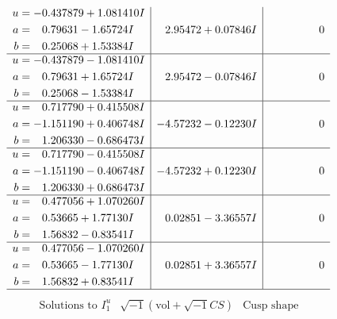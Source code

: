 \documentclass[1p]{elsarticle_modified}
\theoremstyle{definition}
\newcommand{\I}{\sqrt{-1}}
\begin{document}
$$\begin{array}{c|c|c}
\begin{aligned}
u &= -0.437879 + 1.081410 I \\
a &= \phantom{-}0.79631 - 1.65724 I \\
b &= \phantom{-}0.25068 + 1.53384 I\end{aligned}
 & \phantom{-}2.95472 + 0.07846 I & \phantom{-0.000000 } 0 \\ \hline\begin{aligned}
u &= -0.437879 - 1.081410 I \\
a &= \phantom{-}0.79631 + 1.65724 I \\
b &= \phantom{-}0.25068 - 1.53384 I\end{aligned}
 & \phantom{-}2.95472 - 0.07846 I & \phantom{-0.000000 } 0 \\ \hline\begin{aligned}
u &= \phantom{-}0.717790 + 0.415508 I \\
a &= -1.151190 + 0.406748 I \\
b &= \phantom{-}1.206330 - 0.686473 I\end{aligned}
 & -4.57232 - 0.12230 I & \phantom{-0.000000 } 0 \\ \hline\begin{aligned}
u &= \phantom{-}0.717790 - 0.415508 I \\
a &= -1.151190 - 0.406748 I \\
b &= \phantom{-}1.206330 + 0.686473 I\end{aligned}
 & -4.57232 + 0.12230 I & \phantom{-0.000000 } 0 \\ \hline\begin{aligned}
u &= \phantom{-}0.477056 + 1.070260 I \\
a &= \phantom{-}0.53665 + 1.77130 I \\
b &= \phantom{-}1.56832 - 0.83541 I\end{aligned}
 & \phantom{-}0.02851 - 3.36557 I & \phantom{-0.000000 } 0 \\ \hline\begin{aligned}
u &= \phantom{-}0.477056 - 1.070260 I \\
a &= \phantom{-}0.53665 - 1.77130 I \\
b &= \phantom{-}1.56832 + 0.83541 I\end{aligned}
 & \phantom{-}0.02851 + 3.36557 I & \phantom{-0.000000 } 0\\
 \hline 
 \end{array}$$\newpage$$\begin{array}{c|c|c}  
\text{Solutions to }I^u_{1}& \I (\text{vol} + \sqrt{-1}CS) & \text{Cusp shape}\\

\end{array}$$
\end{document}
